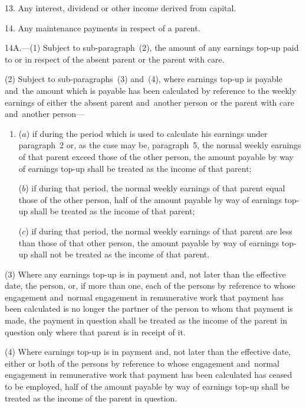 \documentclass[12pt,a4paper]{article}
\begin{document}

\medskip

13.  Any interest, dividend or other income derived from capital.

\medskip

14.  Any maintenance payments in respect of a parent.

\medskip

14A.—(1) Subject to sub-paragraph~(2), the amount of any earnings top-up paid to or in respect of the absent parent or the parent with care.

(2) Subject to sub-paragraphs~(3) and~(4), where earnings top-up is payable and~the amount which is payable has been calculated by reference to the weekly earnings of either the absent parent and~another person or the parent with care and~another person—
\begin{enumerate}\item[]
($a$) if during the period which is used to calculate his earnings under paragraph~2 or, as the case may be, paragraph~5, the normal weekly earnings of that parent exceed those of the other person, the amount payable by way of earnings top-up shall be treated as the income of that parent;

($b$) if during that period, the normal weekly earnings of that parent equal those of the other person, half of the amount payable by way of earnings top-up shall be treated as the income of that parent;

($c$) if during that period, the normal weekly earnings of that parent are less than those of that other person, the amount payable by way of earnings top-up shall not be treated as the income of that parent.
\end{enumerate}

(3) Where any earnings top-up is in payment and, not later than the effective date, the person, or, if more than one, each of the persons by reference to whose engagement and~normal engagement in remunerative work that payment has been calculated is no longer the partner of the person to whom that payment is made, the payment in question shall be treated as the income of the parent in question only where that parent is in receipt of it.

(4) Where earnings top-up is in payment and, not later than the effective date, either or both of the persons by reference to whose engagement and~normal engagement in remunerative work that payment has been calculated has ceased to be employed, half of the amount payable by way of earnings top-up shall be treated as the income of the parent in question.
\end{document}
